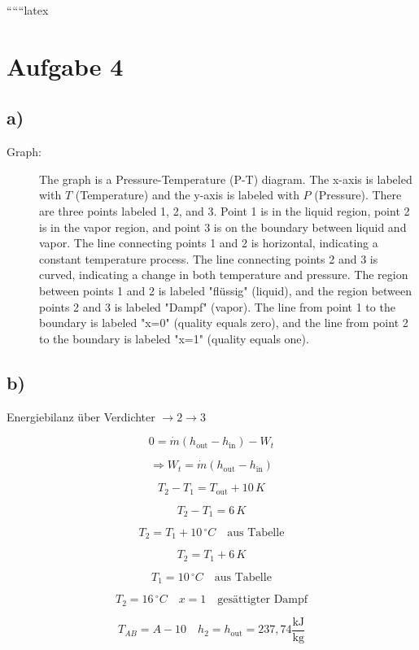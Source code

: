 
``````latex


\section*{Aufgabe 4}

\subsection*{a)}

\begin{description}
    \item[Graph:] The graph is a Pressure-Temperature (P-T) diagram. The x-axis is labeled with $T$ (Temperature) and the y-axis is labeled with $P$ (Pressure). There are three points labeled 1, 2, and 3. Point 1 is in the liquid region, point 2 is in the vapor region, and point 3 is on the boundary between liquid and vapor. The line connecting points 1 and 2 is horizontal, indicating a constant temperature process. The line connecting points 2 and 3 is curved, indicating a change in both temperature and pressure. The region between points 1 and 2 is labeled "flüssig" (liquid), and the region between points 2 and 3 is labeled "Dampf" (vapor). The line from point 1 to the boundary is labeled "x=0" (quality equals zero), and the line from point 2 to the boundary is labeled "x=1" (quality equals one).
\end{description}

\subsection*{b)}

Energiebilanz über Verdichter $\rightarrow 2 \rightarrow 3$

\[
0 = \dot{m} \left( h_{\text{out}} - h_{\text{in}} \right) - W_t
\]

\[
\Rightarrow W_t = \dot{m} \left( h_{\text{out}} - h_{\text{in}} \right)
\]

\[
T_2 - T_1 = T_{\text{out}} + 10\,K
\]

\[
T_2 - T_1 = 6\,K
\]

\[
T_2 = T_1 + 10\,^\circ C \quad \text{aus Tabelle}
\]

\[
T_2 = T_1 + 6\,K
\]

\[
T_1 = 10\,^\circ C \quad \text{aus Tabelle}
\]

\[
T_2 = 16\,^\circ C \quad x = 1 \quad \text{gesättigter Dampf}
\]

\[
T_{AB} = A - 10 \quad h_2 = h_{\text{out}} = 237,74 \frac{\text{kJ}}{\text{kg}}
\]

